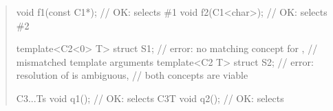 \begin{quote}
\begin{codeblock}
void f1(const C1*); // OK:  selects \#1
void f2(C1<char>);  // OK:  selects \#2

template<C2<0> T> struct S1; // error: no matching concept for ,
                             // mismatched template arguments
template<C2 T> struct S2;    // error: resolution of  is ambiguous,
                             // both concepts are viable

C3{...Ts} void q1(); // OK: selects 
C3{T} void q2();     // OK: selects 
\end{codeblock}
\exitexample

\end{quote}
